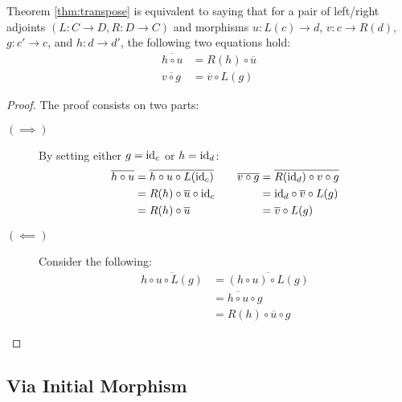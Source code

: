 \begin{theorem}
  Theorem \ref{thm:transpose} is equivalent to saying that for a pair of
  left/right adjoints $(L:C\to D, R:D\to C)$ and morphisms $u:L(c)\to d$,
  $v:c\to R(d)$, $g:c'\to c$, and $h:d\to d'$, the following two equations hold:
  \begin{align*}
    \overline{h\circ u} &= R(h) \circ \overline{u}\\
    \overline{v\circ g} &= \overline{v} \circ L(g)
  \end{align*}

  \begin{proof}
    The proof consists on two parts:
    \begin{description}
      \item[$(\implies)$] By setting either $g=\mathrm{id}_c$ or $h=\mathrm{id}_d$:
        \[
          \begin{aligned}
            \overline{h\circ u}
              &= \overline{h\circ u \circ L(\mathrm{id}_c)}\\
              &= R(h) \circ \overline{u} \circ \mathrm{id}_c\\
              &= R(h) \circ \overline{u}
          \end{aligned}
          \qquad
          \begin{aligned}
            \overline{v\circ g}
              &= \overline{R(\mathrm{id}_d)\circ v\circ g}\\
              &= \mathrm{id}_d \circ \overline{v} \circ L(g)\\
              &= \overline{v} \circ L(g)
          \end{aligned}
        \]
      \item[$(\impliedby)$] Consider the following:
        \[
          \begin{aligned}
            \overline{h \circ u\circ L(g)}
              &= \overline{(h \circ u)\circ L(g)}\\
              &= \overline{h\circ u} \circ g\\
              &= R(h) \circ \overline{u} \circ g
          \end{aligned}
        \]
    \end{description}
  \end{proof}
\end{theorem}

\subsection{Via Initial Morphism}

